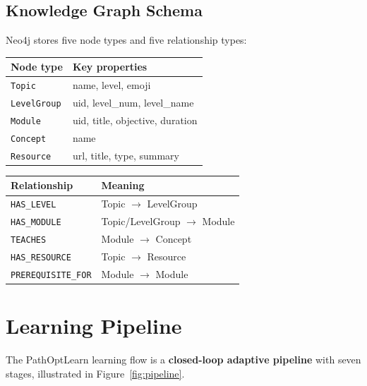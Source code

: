 \documentclass[12pt,a4paper]{article}
\begin{document}
\subsection{Knowledge Graph Schema}

Neo4j stores five node types and five relationship types:

\medskip
\begin{center}
\begin{tabular}{ll}
\toprule
\textbf{Node type} & \textbf{Key properties} \\
\midrule
\texttt{Topic}      & name, level, emoji \\
\texttt{LevelGroup} & uid, level\_num, level\_name \\
\texttt{Module}     & uid, title, objective, duration \\
\texttt{Concept}    & name \\
\texttt{Resource}   & url, title, type, summary \\
\bottomrule
\end{tabular}
\end{center}

\medskip
\begin{center}
\begin{tabular}{ll}
\toprule
\textbf{Relationship} & \textbf{Meaning} \\
\midrule
\texttt{HAS\_LEVEL}        & Topic $\to$ LevelGroup \\
\texttt{HAS\_MODULE}       & Topic/LevelGroup $\to$ Module \\
\texttt{TEACHES}           & Module $\to$ Concept \\
\texttt{HAS\_RESOURCE}     & Topic $\to$ Resource \\
\texttt{PREREQUISITE\_FOR} & Module $\to$ Module \\
\bottomrule
\end{tabular}
\end{center}

\section{Learning Pipeline}

The PathOptLearn learning flow is a \textbf{closed-loop adaptive pipeline}
with seven stages, illustrated in Figure~\ref{fig:pipeline}.
\end{document}
